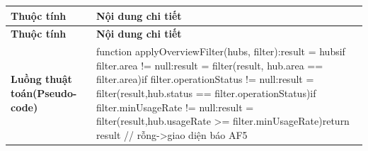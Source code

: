 \begin{longtable}{|L{0.24\textwidth}|L{0.70\textwidth}|}
\hline
\textbf{Thuộc tính} & \textbf{Nội dung chi tiết} \\
\hline
\endfirsthead
\hline
\textbf{Thuộc tính} & \textbf{Nội dung chi tiết} \\
\hline
\endhead
\textbf{Luồng thuật toán}\newline \textbf{(Pseudo-code)} & function applyOverviewFilter(hubs, filter):\newline result = hubs\newline if filter.area != null:\newline result = filter(result, hub.area == filter.area)\newline if filter.operationStatus != null:\newline result = filter(result,\newline hub.status == filter.operationStatus)\newline if filter.minUsageRate != null:\newline result = filter(result,\newline hub.usageRate >= filter.minUsageRate)\newline return result     // rỗng->giao diện báo AF5 \\
\hline
\end{longtable}
\vspace{-0.5\baselineskip}
